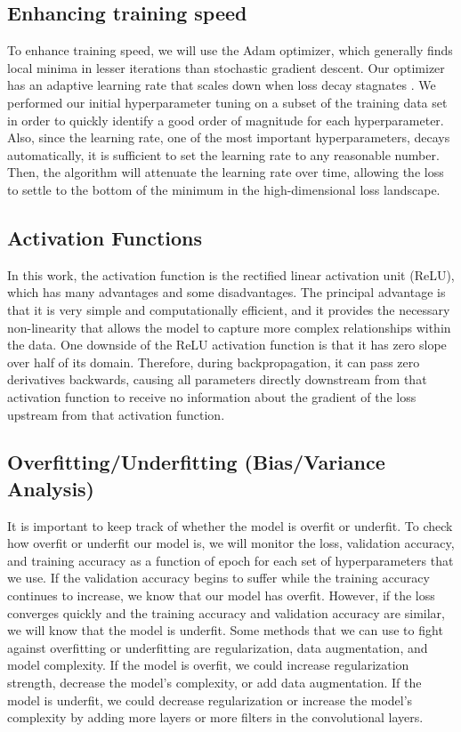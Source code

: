 \documentclass[10pt,twocolumn,letterpaper]{article}
\begin{document}
\subsection*{Enhancing training speed} To enhance training speed, we will use the Adam optimizer\cite{Adam}, which generally finds local minima in lesser iterations than stochastic gradient descent. Our optimizer has an adaptive learning rate that scales down when loss decay stagnates \cite{Liu2017}. We performed our initial hyperparameter tuning on a subset of the training data set in order to quickly identify a good order of magnitude for each hyperparameter. Also, since the learning rate, one of the most important hyperparameters, decays automatically, it is sufficient to set the learning rate to any reasonable number. Then, the algorithm will attenuate the learning rate over time, allowing the loss to settle to the bottom of the minimum in the high-dimensional loss landscape.

\subsection*{Activation Functions}
In this work, the activation function is the rectified linear activation unit (ReLU), which has many advantages and some disadvantages. The principal advantage is that it is very simple and computationally efficient, and it provides the necessary non-linearity that allows the model to capture more complex relationships within the data. One downside of the ReLU activation function is that it has zero slope over half of its domain. Therefore, during backpropagation, it can pass zero derivatives backwards, causing all parameters directly downstream from that activation function to receive no information about the gradient of the loss upstream from that activation function.

\subsection*{Overfitting/Underfitting (Bias/Variance Analysis)} It is important to keep track of whether the model is overfit or underfit. To check how overfit or underfit our model is, we will monitor the loss, validation accuracy, and training accuracy as a function of epoch for each set of hyperparameters that we use. If the validation accuracy begins to suffer while the training accuracy continues to increase, we know that our model has overfit. However, if the loss converges quickly and the training accuracy and validation accuracy are similar, we will know that the model is underfit. Some methods that we can use to fight against overfitting or underfitting are regularization, data augmentation, and model complexity. If the model is overfit, we could increase regularization strength, decrease the model's complexity, or add data augmentation. If the model is underfit, we could decrease regularization or increase the model's complexity by adding more layers or more filters in the convolutional layers.
\end{document}
